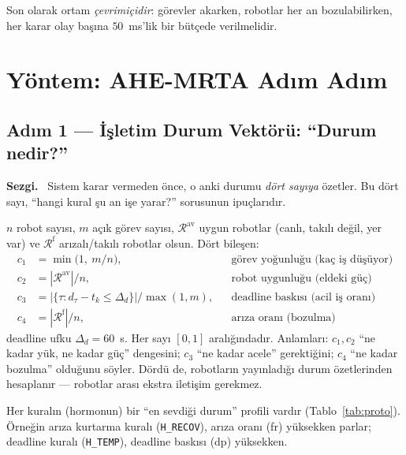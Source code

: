 \documentclass[11pt,a4paper]{article}
\newenvironment{sezgi}
  {\begin{lrbox}{\sezgibox}%
   \begin{minipage}{\dimexpr\linewidth-2\fboxsep-2\fboxrule\relax}%
   \small\textbf{\color{blue!55!black}Sezgi.}~}
  {\end{minipage}\end{lrbox}%
   \par\smallskip\noindent
   \fcolorbox{blue!45!black}{blue!5}{\usebox{\sezgibox}}%
   \par\smallskip}
\newcommand{\R}{\mathcal{R}}
\newcommand{\Htemp}{\texttt{H\_TEMP}}
\newcommand{\Hrecov}{\texttt{H\_RECOV}}
\begin{document}
Son olarak ortam \emph{çevrimiçidir}: görevler akarken, robotlar her an
bozulabilirken, her karar olay başına $50$~ms'lik bir bütçede verilmelidir.

\section{Yöntem: AHE-MRTA Adım Adım}
\label{sec:method}

\subsection{Adım 1 --- İşletim Durum Vektörü: ``Durum nedir?''}
\label{sec:context}

\begin{sezgi}
Sistem karar vermeden önce, o anki durumu \emph{dört sayıya} özetler. Bu dört
sayı, ``hangi kural şu an işe yarar?'' sorusunun ipuçlarıdır.
\end{sezgi}

$n$ robot sayısı, $m$ açık görev sayısı, $\R^{\mathrm{av}}$ uygun robotlar
(canlı, takılı değil, yer var) ve $\R^{\mathrm{f}}$ arızalı/takılı robotlar
olsun. Dört bileşen:
\begin{align}
  c_1 &= \min\!\big(1,\ m/n\big), &&\text{görev yoğunluğu (kaç iş düşüyor)}\\
  c_2 &= |\R^{\mathrm{av}}|/n,    &&\text{robot uygunluğu (eldeki güç)}\\
  c_3 &= \big|\{\tau: d_\tau-t_k\le\Delta_d\}\big|/\max(1,m),
         &&\text{deadline baskısı (acil iş oranı)}\\
  c_4 &= |\R^{\mathrm{f}}|/n,     &&\text{arıza oranı (bozulma)}
\end{align}
deadline ufku $\Delta_d=60$~s. Her sayı $[0,1]$ aralığındadır. Anlamları:
$c_1,c_2$ ``ne kadar yük, ne kadar güç'' dengesini; $c_3$ ``ne kadar acele''
gerektiğini; $c_4$ ``ne kadar bozulma'' olduğunu söyler. Dördü de, robotların
yayınladığı durum özetlerinden hesaplanır --- robotlar arası ekstra iletişim
gerekmez.

Her kuralın (hormonun) bir ``en sevdiği durum'' profili vardır
(Tablo~\ref{tab:proto}). Örneğin arıza kurtarma kuralı (\Hrecov), arıza oranı
(fr) yüksekken parlar; deadline kuralı (\Htemp), deadline baskısı (dp)
yüksekken.
\end{document}
